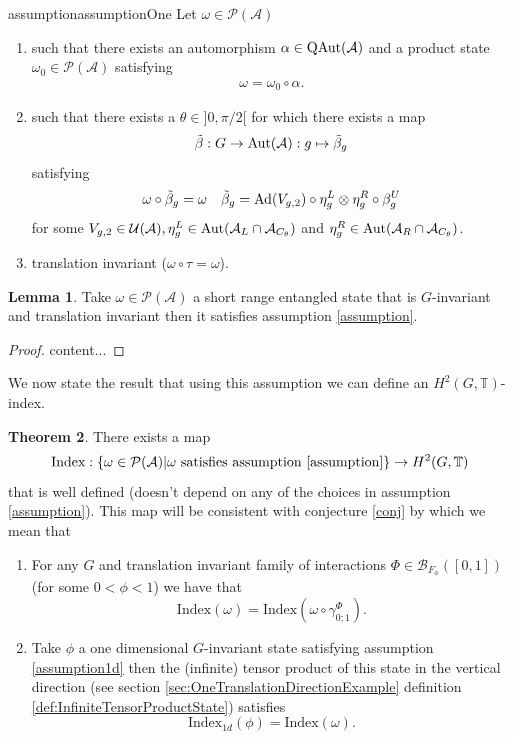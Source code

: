 \documentclass[12pt,a4paper,twoside]{article}
\let\originalleft\left
\let\originalright\right
\renewcommand{\left}{\mathopen{}\mathclose\bgroup\originalleft}
\renewcommand{\right}{\aftergroup\egroup\originalright}
\newcommand{\UU}{\mathcal U}
\newcommand{\BB}{\mathcal B}
\newcommand{\PP}{\mathcal P}
\newcommand{\TT}{\mathbb T}
\renewcommand{\AA}{\mathcal A}
\newcommand{\Ad}[1]{\textrm{Ad}\left(#1\right)}
\newcommand{\Aut}[1]{\textrm{Aut}\left(#1\right)}
\newcommand{\QAut}[1]{\textrm{QAut}\left(#1\right)}
\theoremstyle{definition}
\newtheorem{theorem}{Theorem}[section]
\newtheorem{lemma}[theorem]{Lemma}
\numberwithin{equation}{section}
\begin{document}
\begin{restatable}{assumption}{assumptionOne}\label{assumption}
	Let $\omega\in\PP(\AA)$
	\begin{enumerate}
		\item such that there exists an automorphism $\alpha\in\QAut{\AA}$ and a product state $\omega_0\in\PP(\AA)$ satisfying
		\begin{align}
			\omega=\omega_0\circ\alpha.
		\end{align}
		\item such that there exists a $\theta\in]0,\pi/2[$ for which there exists a map
		\begin{equation}
			\tilde\beta:G\rightarrow\Aut{\AA}:g\mapsto\tilde\beta_g
		\end{equation}
		satisfying
		\begin{align}
			\omega\circ\tilde\beta_g&=\omega&\tilde\beta_g=\Ad{V_{g,2}}\circ\eta^L_g\otimes\eta^R_g\circ\beta^U_g
		\end{align}
		for some $V_{g,2}\in\UU(\AA),\eta^L_g\in\Aut{\AA_L\cap\AA_{C_\theta}}$ and $\eta^R_g\in\Aut{\AA_R\cap\AA_{C_\theta}}$.
		\item translation invariant ($\omega\circ\tau=\omega$).
	\end{enumerate}
\end{restatable}
\begin{lemma}
	Take $\omega\in\PP(\AA)$ a short range entangled state that is $G$-invariant and translation invariant then it satisfies assumption \ref{assumption}.
\end{lemma}
\begin{proof}
	content...
\end{proof}
We now state the result that using this assumption we can define an $H^2(G,\TT)$-index.
\begin{theorem}
	There exists a map
	\begin{equation}
		\textrm{Index}:\{\omega\in\PP(\AA)|\omega\text{ satisfies assumption \ref{assumption}}\}\rightarrow H^2(G,\TT)
	\end{equation}
	that is well defined (doesn't depend on any of the choices in assumption \ref{assumption}). This map will be consistent with conjecture \ref{conj} by which we mean that
	\begin{enumerate}
		\item For any $G$ and translation invariant family of interactions $\Phi\in\BB_{F_{\phi}}([0,1])$ (for some $0<\phi<1$) we have that
		\begin{equation}
			\textrm{Index}(\omega)=\textrm{Index}(\omega\circ\gamma^{\Phi}_{0;1}).
		\end{equation}
		\item Take $\phi$ a one dimensional $G$-invariant state satisfying assumption \ref{assumption1d} then the (infinite) tensor product of this state in the vertical direction (see section \ref{sec:OneTranslationDirectionExample} definition \ref{def:InfiniteTensorProductState}) satisfies
		\begin{equation}
			\textrm{Index}_{1d}(\phi)=\textrm{Index}(\omega).
		\end{equation}
	\end{enumerate}
\end{theorem}
\end{document}

